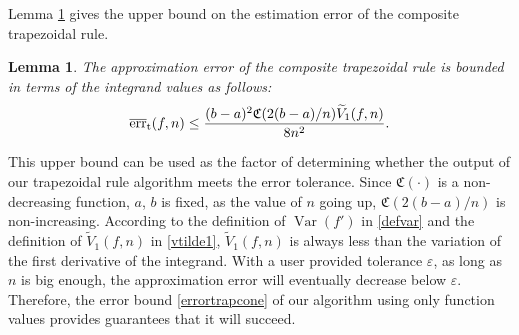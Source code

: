 \documentclass{iitthesis}
\DeclareMathOperator{\Var}{Var}
\newtheorem{lem}{Lemma}
\theoremstyle{definition}
\theoremstyle{remark}
\begin{document}
Lemma \ref{lemmaerrorboundtrap} gives the upper bound on the estimation error of the composite trapezoidal rule.
\begin{lem}\label{lemmaerrorboundtrap}
    The approximation error of the composite trapezoidal rule is bounded in terms of the integrand values as follows:
    \begin{equation}\label{errortrapcone}
      \overline{\textup{err}}_{\textup{t}}(f,n)\leq \frac{(b-a)^2\mathfrak{C}(2(b-a)/n)\widetilde{V}_1(f,n)}{8n^2}.
    \end{equation}
\end{lem}

This upper bound can be used as the factor of determining whether the output of our trapezoidal rule algorithm meets the error tolerance. Since $\mathfrak{C}(\cdot)$ is a non-decreasing function, $a$, $b$ is fixed, as the value of $n$ going up, $\mathfrak{C}(2(b-a)/n)$ is non-increasing. According to the definition of $\Var(f')$ in \eqref{defvar} and the definition of $\widetilde{V}_1(f,n)$ in \eqref{vtilde1}, $\widetilde{V}_1(f,n)$ is always less than the variation of the first derivative of the integrand. With a user provided tolerance $\varepsilon$, as long as $n$ is big enough, the approximation error will eventually decrease below $\varepsilon$. Therefore, the error bound \eqref{errortrapcone} of our algorithm using only function values provides guarantees that it will succeed.

\end{document}
